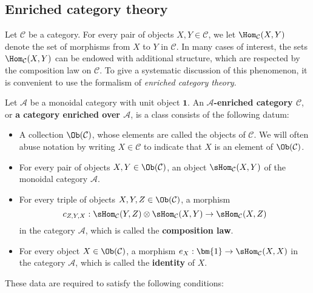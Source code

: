 \subsection{Enriched category theory}
Let $\mathcal{C}$ be a category. For every pair of objects $X,Y\in\mathcal{C}$, we let $\Hom_{\mathcal{C}}(X,Y)$ denote the set of morphisms from $X$ to $Y$ in $\mathcal{C}$. In many cases of interest, the sets $\Hom_{\mathcal{C}}(X,Y)$ can be endowed with additional structure, which are respected by the composition law on $\mathcal{C}$. To give a systematic discussion of this phenomenon, it is convenient to use the formalism of \textit{enriched category theory}.\par
Let $\mathcal{A}$ be a monoidal category with unit object $\bm{1}$. An \textbf{$\mathcal{A}$-enriched category $\mathcal{C}$}, or \textbf{a category enriched over $\mathcal{A}$}, is a class consists of the following datum:
\begin{itemize}
\item A collection $\Ob(\mathcal{C})$, whose elements are called the objects of $\mathcal{C}$. We will often abuse notation by writing $X\in\mathcal{C}$ to indicate that $X$ is an element of $\Ob(\mathcal{C})$.
\item For every pair of objects $X,Y\in\Ob(\mathcal{C})$, an object $\sHom_{\mathcal{C}}(X,Y)$ of the monoidal category $\mathcal{A}$.
\item For every triple of objects $X,Y,Z\in\Ob(\mathcal{C})$, a morphism
\[c_{Z,Y,X}:\sHom_{\mathcal{C}}(Y,Z)\otimes\sHom_{\mathcal{C}}(X,Y)\to\sHom_{\mathcal{C}}(X,Z)\]
in the category $\mathcal{A}$, which is called the \textbf{composition law}.
\item For every object $X\in\Ob(\mathcal{C})$, a morphism $e_X:\bm{1}\to\sHom_{\mathcal{C}}(X,X)$ in the category $\mathcal{A}$, which is called the \textbf{identity} of $X$.
\end{itemize}
These data are required to satisfy the following conditions:
